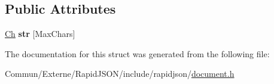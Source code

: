 \subsection*{Public Attributes}
\begin{DoxyCompactItemize}
\item 
\hyperlink{class_generic_value_ade0e0ce64ccd5d852da57a35e720bafb}{Ch} {\bfseries str} \mbox{[}Max\+Chars\mbox{]}\hypertarget{struct_generic_value_1_1_short_string_a444e24523d4cc33830d18a2cfcfd333b}{}\label{struct_generic_value_1_1_short_string_a444e24523d4cc33830d18a2cfcfd333b}

\end{DoxyCompactItemize}


The documentation for this struct was generated from the following file\+:\begin{DoxyCompactItemize}
\item 
Commun/\+Externe/\+Rapid\+J\+S\+O\+N/include/rapidjson/\hyperlink{document_8h}{document.\+h}\end{DoxyCompactItemize}
